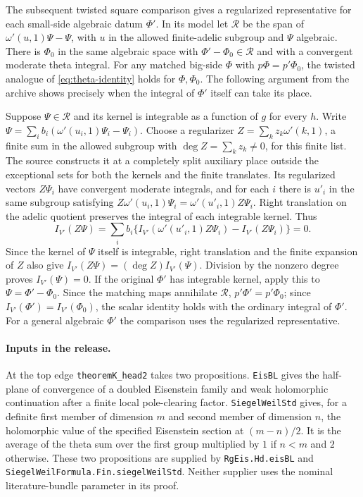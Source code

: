 The subsequent twisted square comparison gives a regularized
representative for each small-side algebraic datum \(\Phi'\).
In its model let \(\mathcal R\) be the span of
\(\omega'(u,1)\Psi-\Psi\), with \(u\) in the allowed finite-adelic
subgroup and \(\Psi\) algebraic. There is \(\Phi_0\) in the same
algebraic space with \(\Phi'-\Phi_0\in\mathcal R\) and with a
convergent moderate theta integral. For any matched big-side
\(\Phi\) with \(p\Phi=p'\Phi_0\), the twisted analogue of
\eqref{eq:theta-identity} holds for \(\Phi,\Phi_0\).
The following argument from the archive shows precisely when the
integral of \(\Phi'\) itself can take its place.

Suppose \(\Psi\in\mathcal R\) and its kernel is integrable as a
function of \(g\) for every \(h\). Write
\(\Psi=\sum_i b_i(\omega'(u_i,1)\Psi_i-\Psi_i)\).
Choose a regularizer \(Z=\sum_k z_k\omega'(k,1)\), a finite sum in
the allowed subgroup with \(\deg Z=\sum_kz_k\ne0\), for this finite
list. The source constructs it at a completely split auxiliary place
outside the exceptional sets for both the kernels and the finite
translates. Its regularized vectors \(Z\Psi_i\) have convergent
moderate integrals, and for each \(i\) there is \(u'_i\) in the
same subgroup satisfying
\(Z\omega'(u_i,1)\Psi_i=\omega'(u'_i,1)Z\Psi_i\).
Right translation on the adelic quotient preserves the integral
of each integrable kernel. Thus
\[
 I_{V'}(Z\Psi)=
   \sum_i b_i\{I_{V'}(\omega'(u'_i,1)Z\Psi_i)-I_{V'}(Z\Psi_i)\}=0 .
\]
Since the kernel of \(\Psi\) itself is integrable, right translation
and the finite expansion of \(Z\) also give
\(I_{V'}(Z\Psi)=(\deg Z)I_{V'}(\Psi)\).
Division by the nonzero degree proves \(I_{V'}(\Psi)=0\).
If the original \(\Phi'\) has integrable kernel, apply this to
\(\Psi=\Phi'-\Phi_0\). Since the matching maps annihilate
\(\mathcal R\), \(p'\Phi'=p'\Phi_0\); since
\(I_{V'}(\Phi')=I_{V'}(\Phi_0)\), the scalar identity holds with
the ordinary integral of \(\Phi'\). For a general algebraic
\(\Phi'\) the comparison uses the regularized representative.

\paragraph{Inputs in the release.}
At the top edge \texttt{theorem\allowbreak{}K\_\allowbreak{}head2} takes two propositions.
\texttt{Eis\allowbreak{}BL} gives the half-plane of convergence of a doubled
Eisenstein family and weak holomorphic continuation after a finite
local pole-clearing factor. \texttt{Siegel\allowbreak{}Weil\allowbreak{}Std} gives, for a
definite first member of dimension \(m\) and second member of
dimension \(n\), the holomorphic value of the specified Eisenstein
section at \((m-n)/2\). It is the average of the theta sum over the
first group multiplied by \(1\) if \(n<m\) and \(2\) otherwise.
These two propositions are supplied by \texttt{Rg\allowbreak{}Eis.\allowbreak{}Hd.\allowbreak{}eis\allowbreak{}BL}
and \texttt{Siegel\allowbreak{}Weil\allowbreak{}Formula.\allowbreak{}Fin.\allowbreak{}siegel\allowbreak{}Weil\allowbreak{}Std}. Neither supplier
uses the nominal literature-bundle parameter in its proof.

